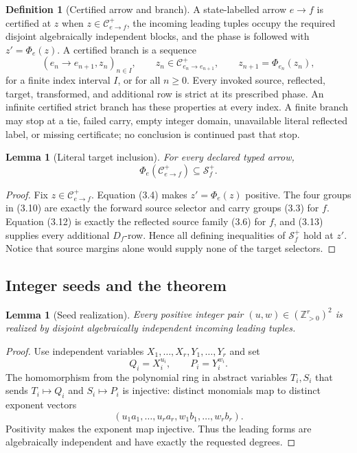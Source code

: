 \documentclass[11pt]{article}
\newtheorem{lemma}[theorem]{Lemma}
\theoremstyle{definition}
\newtheorem{definition}[theorem]{Definition}
\theoremstyle{remark}
\begin{document}
\begin{definition}[Certified arrow and branch]
A state-labelled arrow \(e\to f\) is certified at \(z\) when
\(z\in\mathcal C_{e\to f}^+\), the incoming leading tuples occupy the
required disjoint algebraically independent blocks, and the phase is
followed with \(z'=\Phi_e(z)\).  A certified branch is a sequence
\[
 (e_n\to e_{n+1},z_n)_{n\in I},\qquad
 z_n\in\mathcal C_{e_n\to e_{n+1}}^+,\qquad
 z_{n+1}=\Phi_{e_n}(z_n),
\]
for a finite index interval \(I\), or for all \(n\geq0\).  Every invoked
source, reflected, target, transformed, and additional row is strict at
its prescribed phase.  An infinite certified strict branch has these
properties at every index.  A finite branch may stop at a tie, failed
carry, empty integer domain, unavailable literal reflected label, or
missing certificate; no conclusion is continued past that stop.
\end{definition}

\begin{lemma}[Literal target inclusion]
\label{lem:target-inclusion}
For every declared typed arrow,
\[
 \Phi_e(\mathcal C_{e\to f}^+)\subseteq\mathcal S_f^+.
\tag{3.14}
\]
\end{lemma}

\begin{proof}
Fix \(z\in\mathcal C_{e\to f}^+\).  Equation (3.4) makes
\(z'=\Phi_e(z)\) positive.  The four groups in (3.10) are exactly the
forward source selector and carry groups (3.3) for \(f\).  Equation (3.12)
is exactly the reflected source family (3.6) for \(f\), and (3.13) supplies
every additional \(D_f\)-row.  Hence all defining inequalities of
\(\mathcal S_f^+\) hold at \(z'\).  Notice that source margins alone would
supply none of the target selectors.
\end{proof}

\subsection{Integer seeds and the theorem}

\begin{lemma}[Seed realization]
\label{lem:seed-realization}
Every positive integer pair
\((u,w)\in(\mathbb Z_{>0}^r)^2\) is realized by disjoint algebraically
independent incoming leading tuples.
\end{lemma}

\begin{proof}
Use independent variables
\(X_1,\ldots,X_r,Y_1,\ldots,Y_r\) and set
\[
 Q_i=X_i^{u_i},\qquad P_i=Y_i^{w_i}.
\]
The homomorphism from the polynomial ring in abstract variables \(T_i,S_i\)
that sends \(T_i\mapsto Q_i\) and \(S_i\mapsto P_i\) is injective:
distinct monomials map to distinct exponent vectors
\[
 (u_1a_1,\ldots,u_ra_r,w_1b_1,\ldots,w_rb_r).
\]
Positivity makes the exponent map injective.  Thus the leading forms are
algebraically independent and have exactly the requested degrees.
\end{proof}
\end{document}
